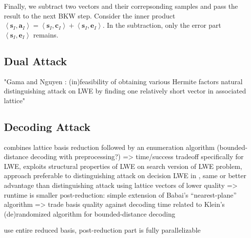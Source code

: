 Finally, we subtract two vectors and their correpsonding samples and pass the result to the next BKW step. Consider the inner product$\left\langle \mathbf{s}_{I}, \mathbf{a}_{I} \right\rangle = \left\langle \mathbf{s}_{I}, \mathbf{c}_{I} \right\rangle + \left\langle \mathbf{s}_{I}, \mathbf{e}_{I} \right\rangle$. In the subtraction, only the error part $\left\langle \mathbf{s}_{I}, \mathbf{e}_{I} \right\rangle$ remains. 






\subsection{Dual Attack \cite{MR09}}
"Gama and Nguyen \cite{GN08b}: (in)feasibility of obtaining various Hermite factors
natural distinguishing attack on LWE by finding one relatively short vector in associated lattice"




\subsection{Decoding Attack \cite{LP11}} \label{sec:decoding}

combines lattice basis reduction followed by an enumeration algorithm (bounded-distance decoding with preprocessing?) => time/success tradeoff
specifically for LWE, exploits structural properties of LWE
on search version of LWE problem, approach preferable to distinguishing attack on decision LWE in \cite{MR09, RS10}, same or better advantage than distinguishing attack using lattice vectors of lower quality => runtime is smaller
post-reduction: simple extension of Babai's ``nearest-plane'' algorithm \cite{Bab85} %
=> trade basis quality against decoding time
related to Klein's (de)randomized algorithm \cite{Kle00} for bounded-distance decoding

use entire reduced basis, post-reduction part is fully parallelizable



